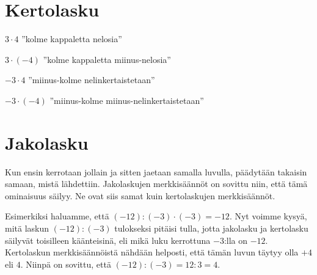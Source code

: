 

\section{Kertolasku}

    $3 \cdot 4$ ''kolme kappaletta nelosia''
    
    
    $3 \cdot (-4)$ ''kolme kappaletta miinus-nelosia''
    
    
    $-3 \cdot 4$ ''miinus-kolme nelinkertaistetaan''
    
    
    $-3 \cdot (-4)$ ''miinus-kolme miinus-nelinkertaistetaan''
    

\section{Jakolasku}

        Kun ensin kerrotaan jollain ja sitten jaetaan samalla luvulla, päädytään takaisin samaan, mistä lähdettiin.  Jakolaskujen merkkisäännöt on sovittu niin, että tämä ominaisuus säilyy. Ne ovat siis samat kuin kertolaskujen merkkisäännöt.
    
    Esimerkiksi haluamme, että $(-12):(-3)\cdot (-3)=-12$. Nyt voimme kysyä, mitä laskun $(-12):(-3)$ tulokseksi pitäisi tulla, jotta jakolasku ja kertolasku säilyvät toisilleen käänteisinä, eli mikä luku kerrottuna $-3$:lla on $-12$. Kertolaskun merkkisäännöistä nähdään helposti, että tämän luvun täytyy olla $+4$ eli $4$. Niinpä on sovittu, että $(-12):(-3)=12:3=4$.


